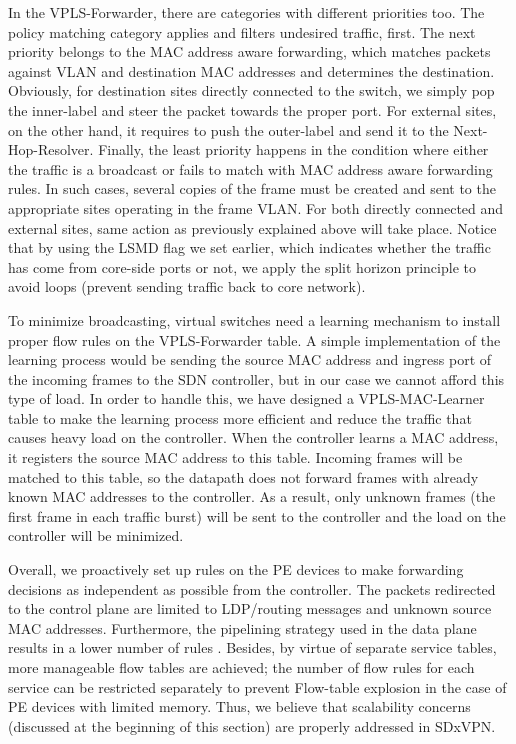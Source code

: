 \documentclass[10pt,conference]{IEEEtran}
\begin{document}
In the VPLS-Forwarder, there are categories with different priorities too.  The policy matching category applies and filters undesired traffic, first.  The next priority belongs to the MAC address aware forwarding, which matches packets against VLAN and destination MAC addresses and determines the destination. Obviously, for destination sites directly connected to the switch, we simply pop the inner-label and steer the packet towards the proper port. For external sites, on the other hand, it requires to push the outer-label and send it to the Next-Hop-Resolver. Finally, the least priority happens in the condition where either the traffic is a broadcast or fails to match with MAC address aware forwarding rules. In such cases, several copies of the frame must be created and sent to the appropriate sites operating in the frame VLAN. For both directly connected and external sites, same action as previously explained above will take place. Notice that by using the LSMD flag we set earlier, which indicates whether the traffic has come from core-side ports or not, we apply the split horizon principle to avoid loops \cite{14} (prevent sending traffic back to core network). 

To minimize broadcasting, virtual switches need a learning mechanism to install proper flow rules on the VPLS-Forwarder table.  A  simple  implementation of  the learning  process  would be sending the source MAC address and ingress port of the incoming frames to the SDN controller, but in our case we cannot afford  this  type  of  load.  In order to handle this, we have designed a VPLS-MAC-Learner table to make the learning process more efficient and reduce the traffic that causes heavy load on the controller. When the controller learns a MAC address, it registers the source MAC address to this table. Incoming frames will be matched to this table, so the datapath does not forward frames with already known MAC addresses to the controller. As a result, only unknown frames (the first frame in each traffic burst) will be sent to the controller and the load on the controller will be minimized.

Overall, we proactively set up rules on the PE devices to make forwarding decisions as independent as possible from the controller. The packets redirected to the control plane are limited to LDP/routing messages and unknown source MAC addresses. Furthermore, the pipelining strategy used in the data plane results in a lower number of rules \cite{15}. Besides, by virtue of separate service tables, more manageable flow tables are achieved; the number of flow rules for each service can be restricted separately to prevent Flow-table explosion in the case of PE devices with limited memory. Thus, we believe that scalability concerns (discussed at the beginning of this section) are properly addressed in SDxVPN.
\end{document}

